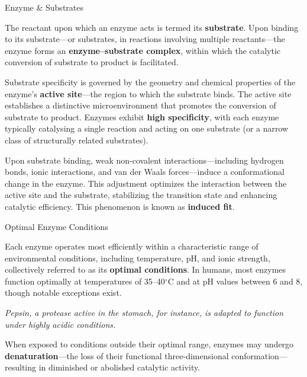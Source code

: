 \documentclass[10pt]{article}
\begin{document}
    \begin{core}{Enzyme \& Substrates}

      The reactant upon which an enzyme acts is termed its \textbf{substrate}. Upon binding to its substrate---or substrates, in reactions involving multiple reactants---the enzyme forms an \textbf{enzyme--substrate complex}, within which the catalytic conversion of substrate to product is facilitated.


      Substrate specificity is governed by the geometry and chemical properties of the enzyme's \textbf{active site}---the region to which the substrate binds. The active site establishes a distinctive microenvironment that promotes the conversion of substrate to product. Enzymes exhibit \textbf{high specificity}, with each enzyme typically catalysing a single reaction and acting on one substrate (or a narrow class of structurally related substrates).

      Upon substrate binding, weak non-covalent interactions---including hydrogen bonds, ionic interactions, and van der Waals forces---induce a conformational change in the enzyme. This adjustment optimizes the interaction between the active site and the substrate, stabilizing the transition state and enhancing catalytic efficiency. This phenomenon is known as \textbf{induced fit}.


    \end{core}

    \begin{core}{Optimal Enzyme Conditions}

      Each enzyme operates most efficiently within a characteristic range of environmental conditions, including temperature, pH, and ionic strength, collectively referred to as its \textbf{optimal conditions}. In humans, most enzymes function optimally at temperatures of 35--40$^\circ$C and at pH values between 6 and 8, though notable exceptions exist. 

      \textit{Pepsin, a protease active in the stomach, for instance, is adapted to function under highly acidic conditions.} 

      When exposed to conditions outside their optimal range, enzymes may undergo \textbf{denaturation}---the loss of their functional three-dimensional conformation---resulting in diminished or abolished catalytic activity.

    \end{core}
\end{document}
